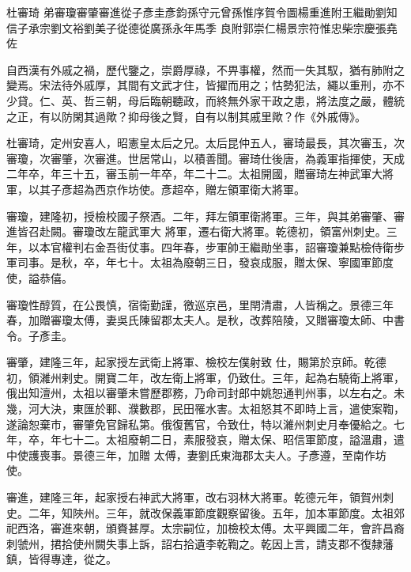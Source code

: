 
\begin{pinyinscope}

 杜審琦
 弟審瓊審肇審進從子彥圭彥鈞孫守元曾孫惟序賀令圖楊重進附王繼勛劉知信子承宗劉文裕劉美子從德從廣孫永年馬季
 良附郭崇仁楊景宗符惟忠柴宗慶張堯佐



 自西漢有外戚之禍，歷代鑒之，崇爵厚祿，不畀事權，然而一失其馭，猶有肺附之變焉。宋法待外戚厚，其間有文武才住，皆擢而用之；怙勢犯法，繩以重刑，亦不少貸。仁、英、哲三朝，母后臨朝聽政，而終無外家干政之患，將法度之嚴，體統之正，有以防閑其過歟？抑母後之賢，自有以制其戚里歟？作《外戚傳》。



 杜審琦，定州安喜人，昭憲皇太后之兄。太后昆仲五人，審琦最長，其次審玉，次審瓊，次審肇，次審進。世居常山，以積善聞。審琦仕後唐，為義軍指揮使，天成二年卒，年三十五，審玉前一年卒，年二十二。太祖開國，贈審琦左神武軍大將軍，以其子彥超為西京作坊使。彥超卒，贈左領軍衛大將軍。



 審瓊，建隆初，授檢校國子祭酒。二年，拜左領軍衛將軍。三年，與其弟審肇、審進皆召赴闕。審瓊改左龍武軍大
 將軍，遷右衛大將軍。乾德初，領富州刺史。三年，以本官權判右金吾街仗事。四年春，步軍帥王繼勛坐事，詔審瓊兼點檢侍衛步軍司事。是秋，卒，年七十。太祖為廢朝三日，發哀成服，贈太保、寧國軍節度使，謚恭僖。



 審瓊性醇質，在公畏慎，宿衛勤謹，徼巡京邑，里閈清肅，人皆稱之。景德三年春，加贈審瓊太傅，妻吳氏陳留郡太夫人。是秋，改葬陪陵，又贈審瓊太師、中書令。子彥圭。



 審肇，建隆三年，起家授左武衛上將軍、檢校左僕射致
 仕，賜第於京師。乾德初，領濰州剌史。開寶二年，改左衛上將軍，仍致仕。三年，起為右驍衛上將軍，俄出知澶州，太祖以審肇未嘗歷郡務，乃命司封郎中姚恕通判州事，以左右之。未幾，河大決，東匯於鄆、濮數郡，民田罹水害。太祖怒其不即時上言，遣使案鞫，遂論恕棄市，審肇免官歸私第。俄復舊官，令致仕，特以濰州刺史月奉優給之。七年，卒，年七十二。太祖廢朝二日，素服發哀，贈太保、昭信軍節度，謚溫肅，遣中使護喪事。景德三年，加贈
 太傅，妻劉氏東海郡太夫人。子彥遵，至南作坊使。



 審進，建隆三年，起家授右神武大將軍，改右羽林大將軍。乾德元年，領賀州刺史。二年，知陜州。三年，就改保義軍節度觀察留後。五年，加本軍節度。太祖郊祀西洛，審進來朝，頒賚甚厚。太宗嗣位，加檢校太傅。太平興國二年，會許昌裔刺虢州，捃拾使州闕失事上訴，詔右拾遺李乾鞫之。乾因上言，請支郡不復隸藩鎮，皆得專達，從之。




\end{pinyinscope}
